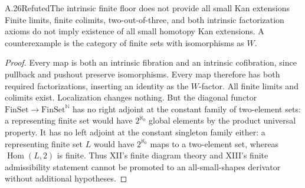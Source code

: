 \begin{claim}{A.26}{Refuted}{The intrinsic finite floor does not provide all small Kan extensions}
Finite limits, finite colimits, two-out-of-three, and both intrinsic factorization axioms do not imply existence of all small homotopy Kan extensions. A counterexample is the category of finite sets with isomorphisms as $W$.
\end{claim}
\begin{proof}
Every map is both an intrinsic fibration and an intrinsic cofibration, since pullback and pushout preserve isomorphisms. Every map therefore has both required factorizations, inserting an identity as the $W$-factor. All finite limits and colimits exist. Localization changes nothing. But the diagonal functor $\mathrm{FinSet}\to\mathrm{FinSet}^{\mathbb N}$ has no right adjoint at the constant family of two-element sets: a representing finite set would have $2^{\aleph_0}$ global elements by the product universal property. It has no left adjoint at the constant singleton family either: a representing finite set $L$ would have $2^{\aleph_0}$ maps to a two-element set, whereas $\operatorname{Hom}(L,2)$ is finite. Thus XII's finite diagram theory and XIII's finite admissibility statement cannot be promoted to an all-small-shapes derivator without additional hypotheses.
\end{proof}

